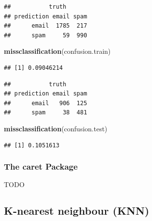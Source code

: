 \documentclass[]{book}
\newenvironment{Shaded}{\begin{snugshade}}{\end{snugshade}}
\newcommand{\KeywordTok}[1]{\textcolor[rgb]{0.13,0.29,0.53}{\textbf{#1}}}
\newcommand{\DataTypeTok}[1]{\textcolor[rgb]{0.13,0.29,0.53}{#1}}
\newcommand{\DecValTok}[1]{\textcolor[rgb]{0.00,0.00,0.81}{#1}}
\newcommand{\StringTok}[1]{\textcolor[rgb]{0.31,0.60,0.02}{#1}}
\newcommand{\CommentTok}[1]{\textcolor[rgb]{0.56,0.35,0.01}{\textit{#1}}}
\newcommand{\OperatorTok}[1]{\textcolor[rgb]{0.81,0.36,0.00}{\textbf{#1}}}
\newcommand{\NormalTok}[1]{#1}
\theoremstyle{definition}
\theoremstyle{definition}
\theoremstyle{definition}
\theoremstyle{remark}
\begin{document}
\begin{verbatim}
##           truth
## prediction email spam
##      email  1785  217
##      spam     59  990
\end{verbatim}

\begin{Shaded}
\begin{Highlighting}[]
\KeywordTok{missclassification}\NormalTok{(confusion.train)}
\end{Highlighting}
\end{Shaded}

\begin{verbatim}
## [1] 0.09046214
\end{verbatim}

\begin{Shaded}
\end{Shaded}

\begin{verbatim}
##           truth
## prediction email spam
##      email   906  125
##      spam     38  481
\end{verbatim}

\begin{Shaded}
\begin{Highlighting}[]
\KeywordTok{missclassification}\NormalTok{(confusion.test)}
\end{Highlighting}
\end{Shaded}

\begin{verbatim}
## [1] 0.1051613
\end{verbatim}

\subsubsection{The caret Package}\label{the-caret-package}

TODO

\subsection{K-nearest neighbour (KNN)}\label{k-nearest-neighbour-knn}
\end{document}
